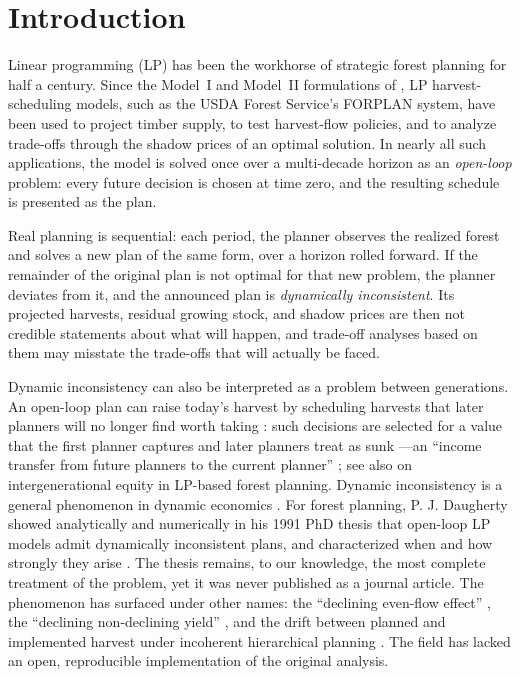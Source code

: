 \section{Introduction}

Linear programming (LP) has been the workhorse of strategic forest planning for half a century. Since the Model~I and Model~II formulations of \citet{johnson1977techniques}, LP harvest-scheduling models, such as the USDA Forest Service's FORPLAN system, have been used to project timber supply, to test harvest-flow policies, and to analyze trade-offs through the shadow prices of an optimal solution. In nearly all such applications, the model is solved once over a multi-decade horizon as an \emph{open-loop} problem: every future decision is chosen at time zero, and the resulting schedule is presented as the plan.

Real planning is sequential: each period, the planner observes the realized forest and solves a new plan of the same form, over a horizon rolled forward. If the remainder of the original plan is not optimal for that new problem, the planner deviates from it, and the announced plan is \emph{dynamically inconsistent}. Its projected harvests, residual growing stock, and shadow prices are then not credible statements about what will happen, and trade-off analyses based on them may misstate the trade-offs that will actually be faced.

Dynamic inconsistency can also be interpreted as a problem between generations. An open-loop plan can raise today's harvest by scheduling harvests that later planners will no longer find worth taking \citep[p.~332]{gunn2007models}: such decisions are selected for a value that the first planner captures and later planners treat as sunk \citep[p.~41]{daugherty1991credibility}---an ``income transfer from future planners to the current planner'' \citep[p.~142]{daugherty1991credibility}; see also \citet{church1999considering} on intergenerational equity in LP-based forest planning. Dynamic inconsistency is a general phenomenon in dynamic economics \citep{strotz1956myopia,kydland1977rules}. For forest planning, P. J. Daugherty showed analytically and numerically in his 1991 PhD thesis that open-loop LP models admit dynamically inconsistent plans, and characterized when and how strongly they arise \citep{daugherty1991credibility}. The thesis remains, to our knowledge, the most complete treatment of the problem, yet it was never published as a journal article. The phenomenon has surfaced under other names: the ``declining even-flow effect'' \citep{mcquillan1986declining}, the ``declining non-declining yield'' \citep[p.~332, citing Daugherty]{gunn2007models}, and the drift between planned and implemented harvest under incoherent hierarchical planning \citep{paradis2013risk}. The field has lacked an open, reproducible implementation of the original analysis.

